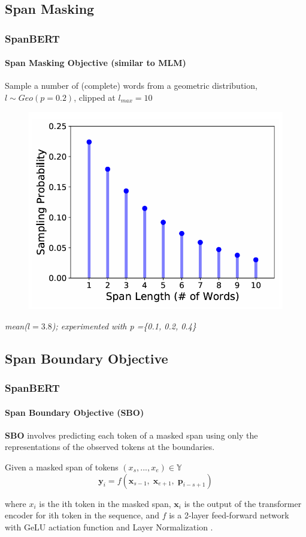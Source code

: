 \documentclass[12pt]{beamer}
\begin{document}
	\subsection{Span Masking}
	\begin{frame}
		\frametitle{SpanBERT}
		\framesubtitle{Span Masking Objective (similar to MLM)}
		
		Sample a number of (complete) words from a geometric distribution, $l \sim Geo(p = 0.2)$, clipped at $l_{max} = 10$
		
		\begin{figure}
			\centering
			\includegraphics[width=.7\textwidth]{spanlength.png}
		\end{figure}
		
		{ \small
			\textit{mean($l = 3.8$); experimented with p =\{0.1, 0.2, 0.4\}}
		}
		
	\end{frame}
	
	\subsection{Span Boundary Objective}
	\begin{frame}
		\frametitle{SpanBERT}
		\framesubtitle{Span Boundary Objective (SBO)}
		
		{ \large
			\textbf{SBO} involves predicting each token of a masked span using only the representations of the observed tokens at the boundaries.
		} \newline
		
		Given a masked span of tokens $(x_{s}, . . . , x_{e}) \in \mathbb{Y}$ \newline
		\[ \mathbf{y}_{i} = f ( \mathbf{\textbf{x}}_{s-1}, \; \mathbf{\textbf{x}}_{e+1}, \; \mathbf{\textbf{p}}_{i-s+1} ) \]
		
		where $x_i$ is the ith token in the masked span, $\mathbf{\textbf{x}}_i$ is the output of the transformer encoder for ith token in the sequence, and $f$ is a 2-layer feed-forward network with GeLU actiation function \cite{gelu} and Layer Normalization \cite{normlayer}.
		
	\end{frame}
	
\end{document}
